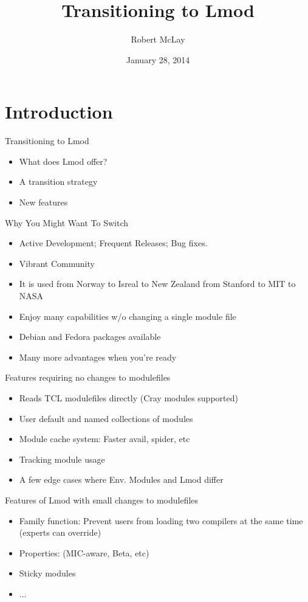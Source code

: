 \documentclass{beamer}
\title{Transitioning to Lmod}
\author{Robert McLay}
\institute{The Texas Advanced Computing Center}
\date{January 28, 2014}  %
\begin{document}
\begin{frame}
  \titlepage
\end{frame}

\section{Introduction}

\begin{frame}{Transitioning to Lmod}
  \begin{itemize}
    \item What does Lmod offer?
    \item A transition strategy
    \item New features
  \end{itemize}
\end{frame}


\begin{frame}{Why You Might Want To Switch}
  \begin{itemize}
    \item Active Development;  Frequent Releases; Bug fixes.
    \item Vibrant Community
    \item It is used from Norway to Isreal to New Zealand from Stanford to MIT to NASA
    \item Enjoy many capabilities w/o changing a single module file
    \item Debian and Fedora packages available
    \item Many more advantages when you're ready
  \end{itemize}
\end{frame}

\begin{frame}{Features requiring no changes to modulefiles}
  \begin{itemize}
    \item Reads TCL modulefiles directly (Cray modules supported)
    \item User default and named collections of modules
    \item Module cache system: Faster avail, spider, etc
    \item Tracking module usage
    \item A few edge cases where Env. Modules and Lmod differ
  \end{itemize}
\end{frame}

\begin{frame}{Features of Lmod with small changes to modulefiles}
  \begin{itemize}
    \item Family function: Prevent users from loading two compilers at
      the same time (experts can override)
    \item Properties: (MIC-aware, Beta, etc)
    \item Sticky modules
    \item ...
  \end{itemize}
\end{frame}
\end{document}
